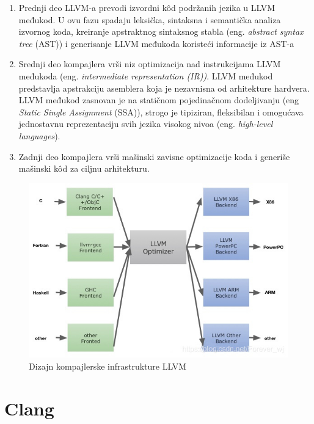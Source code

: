 \documentclass[12pt,oneside]{memoir}
\begin{document}
\begin{enumerate}
  \item Prednji deo LLVM-a prevodi izvordni k\^od podr\v{z}anih jezika u LLVM međukod. U ovu fazu spadaju leksi\v{c}ka, sintaksna i semanti\v{c}ka analiza
  izvornog koda, kreiranje apstraktnog sintaksnog stabla (eng. \textit{abstract syntax tree} (AST)) i generisanje LLVM međukoda koriste\'{c}i informacije iz AST-a
  \item{Srednji deo kompajlera vr\v{s}i niz optimizacija nad instrukcijama LLVM međukoda (eng. \textit{intermediate representation (IR))}. LLVM međukod predstavlja apstrakciju asemblera koja je nezavnisna od arhitekture hardvera. LLVM međukod zasnovan je na stati\v{c}nom pojedina\v{c}nom dodeljivanju (eng \textit{Static Single Assignment} (SSA)), strogo je tipiziran, fleksibilan i omogu\'{c}ava jednostavnu reprezentaciju svih jezika visokog nivoa (eng. \textit{high-level languages}).}
  \item{Zadnji deo kompajlera vr\v{s}i ma\v{s}inski zavisne optimizacije koda i generi\v{s}e ma\v{s}inski k\^{o}d  za ciljnu arhitekturu.}
\end{enumerate}

\begin{figure}[!h]
\begin{center}
\includegraphics[scale=0.4]{llvmDesign.jpg}
\end{center}
\caption{Dizajn kompajlerske infrastrukture LLVM}
\label{fig:exploded}
\end{figure}

\section{Clang}
\end{document}
